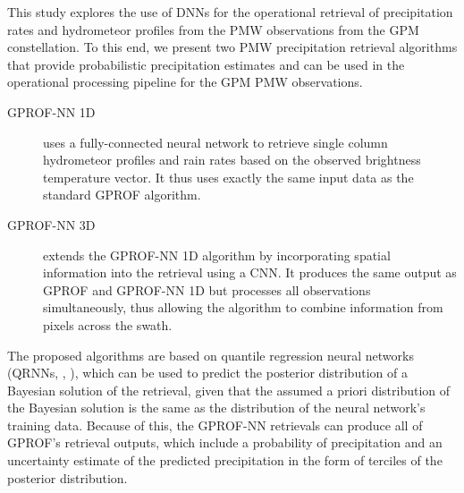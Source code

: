 \documentclass[journal abbreviation, manuscript]{copernicus}
\begin{document}
This study explores the use of DNNs for the operational retrieval of
precipitation rates and hydrometeor profiles from the PMW observations from the
GPM constellation. To this end, we present two PMW precipitation retrieval
algorithms that provide probabilistic precipitation estimates and can be used in
the operational processing pipeline for the GPM PMW observations.

\begin{description}
\item[GPROF-NN 1D] uses a fully-connected neural network to
  retrieve single column hydrometeor profiles and rain rates based on the
  observed brightness temperature vector. It thus uses exactly the same input
  data as the standard GPROF algorithm.
\item[GPROF-NN 3D]  extends the GPROF-NN 1D algorithm by
  incorporating spatial information into the retrieval using a CNN. It produces
  the same output as GPROF and GPROF-NN 1D but processes all observations
  simultaneously, thus allowing the algorithm to combine information from pixels
  across the swath.
\end{description}

The proposed algorithms are based on quantile regression neural networks (QRNNs,
\citeauthor{pfreundschuh18}, \citeyear{pfreundschuh18}), which can be used to
predict the posterior distribution of a Bayesian solution of the retrieval,
given that the assumed a priori distribution of the Bayesian solution is the
same as the distribution of the neural network's training data. Because of this, the
GPROF-NN retrievals can produce all of GPROF's retrieval outputs, which include
a probability of precipitation and an uncertainty estimate of the predicted
precipitation in the form of terciles of the posterior distribution.
\end{document}
